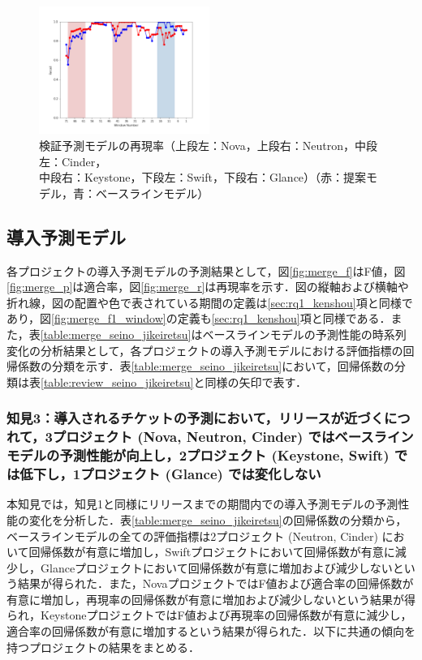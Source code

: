 \documentclass[11pt]{jreport}
\begin{document}
\begin{figure}[H]
\begin{center}
    \includegraphics[width=0.495\textwidth]{Uenaka_fig/RQ1_result/Glance_review_Recall.pdf}
    \caption{検証予測モデルの再現率（上段左：Nova，上段右：Neutron，中段左：Cinder，\\ 中段右：Keystone，下段左：Swift，下段右：Glance）（赤：提案モデル，青：ベースラインモデル）}
    \label{fig:review_r}
\end{center}
\end{figure}


\subsection{導入予測モデル}\label{sec:rq1_donyu}
各プロジェクトの導入予測モデルの予測結果として，図\ref{fig:merge_f}はF値，図\ref{fig:merge_p}は適合率，図\ref{fig:merge_r}は再現率を示す．図の縦軸および横軸や折れ線，図の配置や色で表されている期間の定義は\ref{sec:rq1_kenshou}項と同様であり，図\ref{fig:merge_f1_window}の定義も\ref{sec:rq1_kenshou}項と同様である．また，表\ref{table:merge_seino_jikeiretsu}はベースラインモデルの予測性能の時系列変化の分析結果として，各プロジェクトの導入予測モデルにおける評価指標の回帰係数の分類を示す．表\ref{table:merge_seino_jikeiretsu}において，回帰係数の分類は表\ref{table:review_seino_jikeiretsu}と同様の矢印で表す．

\subsubsection{知見3：導入されるチケットの予測において，リリースが近づくにつれて，3プロジェクト (Nova, Neutron, Cinder) ではベースラインモデルの予測性能が向上し，2プロジェクト (Keystone, Swift) では低下し，1プロジェクト (Glance) では変化しない}
本知見では，知見1と同様にリリースまでの期間内での導入予測モデルの予測性能の変化を分析した．表\ref{table:merge_seino_jikeiretsu}の回帰係数の分類から，ベースラインモデルの全ての評価指標は2プロジェクト (Neutron, Cinder) において回帰係数が有意に増加し，Swiftプロジェクトにおいて回帰係数が有意に減少し，Glanceプロジェクトにおいて回帰係数が有意に増加および減少しないという結果が得られた．また，NovaプロジェクトではF値および適合率の回帰係数が有意に増加し，再現率の回帰係数が有意に増加および減少しないという結果が得られ，KeystoneプロジェクトではF値および再現率の回帰係数が有意に減少し，適合率の回帰係数が有意に増加するという結果が得られた．以下に共通の傾向を持つプロジェクトの結果をまとめる．
\end{document}
